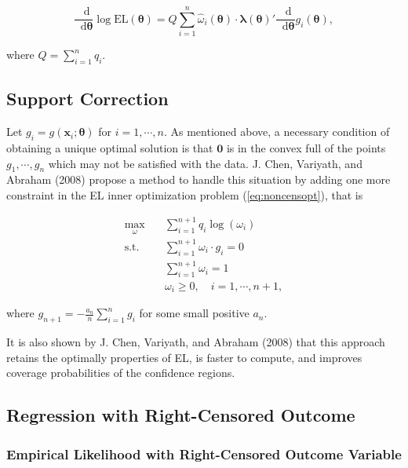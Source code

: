 \documentclass[article]{jss}
\renewcommand{\|}{\,|\,}
\begin{document}
\begin{equation}
\frac{\mathop{}\!\mathrm{d}}{\mathop{}\!\mathrm{d}\bm \theta}\log \textrm{EL}(\bm \theta) = Q \sum_{i=1}^n \hat \omega_i(\bm \theta) \cdot \bm \lambda(\bm \theta)' \frac{\mathop{}\!\mathrm{d}}{\mathop{}\!\mathrm{d}\bm \theta}g_i(\bm \theta),
\end{equation}

where \(Q = \sum_{i=1}^n q_i\).

\hypertarget{support-correction}{%
\subsection{Support Correction}\label{support-correction}}

Let \(g_i = g(\bm x_i;\bm \theta)\) for \(i = 1,\cdots, n\). As mentioned above, a necessary condition of obtaining a unique optimal solution is that \(\bm 0\) is in the convex full of the points \(g_1,\cdots,g_n\) which may not be satisfied with the data. J. Chen, Variyath, and Abraham (2008) propose a method to handle this situation by adding one more constraint in the EL inner optimization problem (\ref{eq:noncensopt}), that is

\begin{equation} \label{eq:noncensoptadj}
\begin{split}
  \max_{\omega}\quad & \sum_{i=1}^{n+1} q_i \log(\omega_i) \\
  \text{s.t.}\quad & \sum_{i=1}^{n+1} \omega_i\cdot g_i = 0 \\
  & \sum_{i=1}^{n+1} \omega_i = 1 \\
  & \omega_i \geq 0, \quad i=1,\cdots,{n+1},
\end{split}
\end{equation}

where \(g_{n+1} = -\frac{a_n}{n} \sum_{i=1}^n g_i\) for some small positive \(a_n\).

It is also shown by J. Chen, Variyath, and Abraham (2008) that this approach retains the optimally properties of EL, is faster to compute, and improves coverage probabilities of the confidence regions.

\hypertarget{regression-with-right-censored-outcome}{%
\subsection{Regression with Right-Censored Outcome}\label{regression-with-right-censored-outcome}}

\hypertarget{empirical-likelihood-with-right-censored-outcome-variable}{%
\subsubsection{Empirical Likelihood with Right-Censored Outcome Variable}\label{empirical-likelihood-with-right-censored-outcome-variable}}
\end{document}
